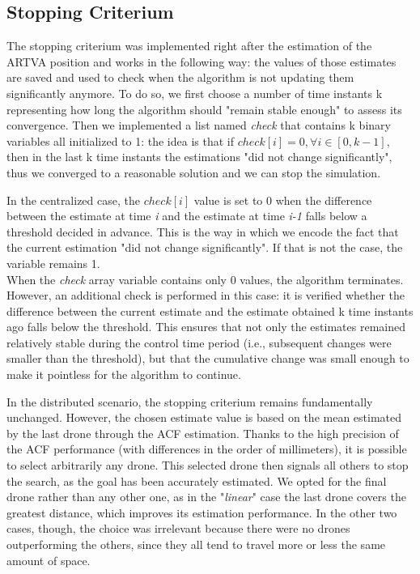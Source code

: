 \subsection{Stopping Criterium}
The stopping criterium was implemented right after the estimation of the ARTVA position and works in the following way: the values of those estimates are saved and used to check when the algorithm is not updating them significantly anymore. To do so, we first choose a number of time instants k representing how long the algorithm should "remain stable enough" to assess its convergence. Then we implemented a list named \textit{check} that contains k binary variables all initialized to 1: the idea is that if $check[i] = 0, \forall i \in [0,k-1]$, then in the last k time instants the estimations "did not change significantly", thus we converged to a reasonable solution and we can stop the simulation.

In the centralized case, the $check[i]$ value is set to 0 when the difference between the estimate at time \textit{i} and the estimate at time \textit{i-1} falls below a threshold decided in advance. This is the way in which we encode the fact that the current estimation "did not change significantly". If that is not the case, the variable remains 1.\\
When the \textit{check} array variable contains only 0 values, the algorithm terminates. However, an additional check is performed in this case: it is verified whether the difference between the current estimate and the estimate obtained k time instants ago falls below the threshold. This ensures that not only the estimates remained relatively stable during the control time period (i.e., subsequent changes were smaller than the threshold), but that the cumulative change was small enough to make it pointless for the algorithm to continue.

In the distributed scenario, the stopping criterium remains fundamentally unchanged. However, the chosen estimate value is based on the mean estimated by the last drone through the ACF estimation. Thanks to the high precision of the ACF performance (with differences in the order of millimeters), it is possible to select arbitrarily any drone. This selected drone then signals all others to stop the search, as the goal has been accurately estimated. We opted for the final drone rather than any other one, as in the "\textit{linear}" case the last drone covers the greatest distance, which improves its estimation performance. In the other two cases, though, the choice was irrelevant because there were no drones outperforming the others, since they all tend to travel more or less the same amount of space.
